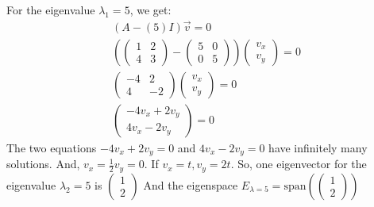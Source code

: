 \documentclass[conference,final,11pt,technote,onecolumn]{IEEEtran}\usepackage[]{graphicx}\usepackage[]{color}
\begin{document}
For the eigenvalue $\lambda_1 = 5$, we get:
\begin{eqnarray}
\nonumber (A- (5)I)\vec v = 0\\
\nonumber (\begin{pmatrix}1 & 2\\4 & 3 \end{pmatrix} - \begin{pmatrix}5 & 0\\0 & 5\end{pmatrix})\begin{pmatrix}v_x\\v_y\end{pmatrix} = 0\\
\nonumber \begin{pmatrix}-4 & 2\\4 & -2\end{pmatrix}\begin{pmatrix}v_x\\v_y\end{pmatrix} = 0\\
\nonumber \begin{pmatrix}-4v_x+2v_y\\4v_x-2v_y\end{pmatrix} = 0
\end{eqnarray}
The two equations $-4v_x+2v_y = 0$ and $4v_x-2v_y = 0$ have infinitely many solutions. And, $v_x=\frac{1}{2}v_y = 0$. If $v_x = t, v_y=2t$.
So, one eigenvector for the eigenvalue $\lambda_2 = 5$ is $\begin{pmatrix}1 \\ 2\end{pmatrix}$ And the eigenspace $E_{\lambda=5} = \text{span}(\begin{pmatrix}1 \\ 2\end{pmatrix})$
\end{document}
